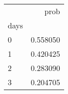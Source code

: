 \begin{tabular}{lr}
\toprule
{} &      prob \\
days &           \\
\midrule
0    &  0.558050 \\
1    &  0.420425 \\
2    &  0.283090 \\
3    &  0.204705 \\
\bottomrule
\end{tabular}
